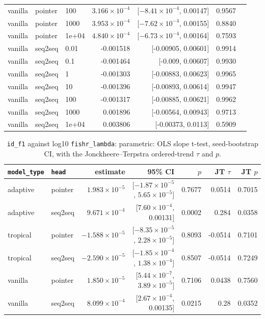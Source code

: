 \documentclass[10pt]{article}
\begin{document}
{\begin{longtable}{lllrrrl}
vanilla & pointer & 100 & $3.166\times10^{-4}$ & [$-8.41\times10^{-4}$, 0.00147] & 0.9567 & \\
vanilla & pointer & 1000 & $3.953\times10^{-4}$ & [$-7.62\times10^{-4}$, 0.00155] & 0.8840 & \\
vanilla & pointer & 1e+04 & $4.840\times10^{-4}$ & [$-6.73\times10^{-4}$, 0.00164] & 0.7593 & \\
vanilla & seq2seq & 0.01 & -0.001518 & [-0.00905, 0.00601] & 0.9914 & \\
vanilla & seq2seq & 0.1 & -0.001464 & [-0.009, 0.00607] & 0.9930 & \\
vanilla & seq2seq & 1 & -0.001303 & [-0.00883, 0.00623] & 0.9965 & \\
vanilla & seq2seq & 10 & -0.001396 & [-0.00893, 0.00614] & 0.9947 & \\
vanilla & seq2seq & 100 & -0.001317 & [-0.00885, 0.00621] & 0.9962 & \\
vanilla & seq2seq & 1000 & 0.001896 & [-0.00564, 0.00943] & 0.9713 & \\
vanilla & seq2seq & 1e+04 & 0.003806 & [-0.00373, 0.0113] & 0.5909 & \\
\bottomrule
\end{longtable}
}

{\small
\begin{longtable}{llrrrrr}
\caption{\texttt{id\_f1} against log10 \texttt{fishr\_lambda}: parametric: OLS slope t-test, seed-bootstrap CI, with the Jonckheere--Terpstra ordered-trend $\tau$ and $p$.}\label{tab:trend-id_f1}\\
\toprule
\texttt{model\_type} & \texttt{head} & estimate & 95\% CI & $p$ & JT $\tau$ & JT $p$\\
\midrule
\endhead
adaptive & pointer & $1.983\times10^{-5}$ & [$-1.87\times10^{-5}$, $5.65\times10^{-5}$] & 0.7677 & 0.0514 & 0.7015\\
adaptive & seq2seq & $9.671\times10^{-4}$ & [$7.60\times10^{-4}$, 0.00131] & 0.0002 & 0.284 & 0.0358\\
tropical & pointer & $-1.588\times10^{-5}$ & [$-8.35\times10^{-5}$, $2.28\times10^{-5}$] & 0.8093 & -0.0514 & 0.7101\\
tropical & seq2seq & $-2.590\times10^{-5}$ & [$-1.85\times10^{-4}$, $1.38\times10^{-4}$] & 0.8507 & -0.0514 & 0.7249\\
vanilla & pointer & $1.850\times10^{-5}$ & [$5.44\times10^{-7}$, $3.89\times10^{-5}$] & 0.7106 & 0.0438 & 0.7560\\
vanilla & seq2seq & $8.099\times10^{-4}$ & [$2.67\times10^{-4}$, 0.00135] & 0.0215 & 0.28 & 0.0352\\
\bottomrule
\end{longtable}
}
\end{document}
